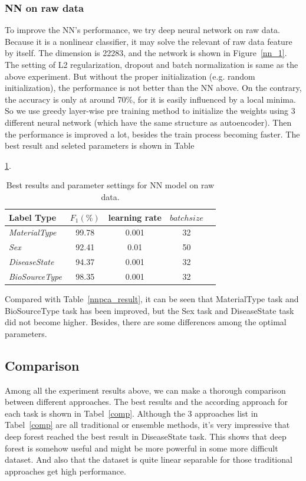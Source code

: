 \documentclass[sigconf]{acmart}
\begin{document}
	\subsubsection{ NN on raw data}
	To improve the NN's performance, we try deep neural network on raw data. Because it is a nonlinear classifier, it may solve the relevant of raw data feature by itself. The dimension is 22283, and the network is shown in Figure~\ref{nn_1}. The setting of L2 regularization, dropout and batch normalization is same as the above experiment. But without the proper initialization (e.g. random initialization), the performance is not better than the NN above. On the contrary, the accuracy is only at around 70\%, for it is easily influenced by a local minima. So we use greedy layer-wise pre training method to initialize the weights using 3 different neural network (which have the same structure as autoencoder). Then the performance is improved a lot, besides the train process becoming faster. The best result and seleted parameters is shown in Table~{\ref{nnraw_result}.\\
			
\begin{table}[tbp]
\centering
\begin{tabular}{l|cccc}
\toprule
{Label Type} & $F_1 (\%)$ & learning rate &$batch size$  \\
\midrule
{\textit{MaterialType}}&99.78 & 0.001 &32\\
{\textit{Sex}}		& 92.41 & 0.01    &50 \\
{\textit{DiseaseState}}& 94.37 & 0.001 &32\\
{\textit{BioSourceType}}& 98.35 & 0.001 &32\\
\bottomrule	
\end{tabular}

\caption{Best results and parameter settings for NN model on raw data. }
\label{nnraw_result}
\end{table}

Compared with Table~\ref{nnpca_result}, it can be seen that MaterialType task and BioSourceType task has been improved, but the Sex task and DiseaseState task did not become higher. Besides, there are some differences among the optimal parameters. 

\subsection{Comparison}
Among all the experiment results above, we can make a thorough comparison between different approaches. The best results and the according approach for each task is shown in Tabel~\ref{comp}. Although the 3 approaches list in Tabel~\ref{comp} are all traditional or ensemble methods, it's very impressive that deep forest reached the best result in DiseaseState task. This shows that deep forest is somehow useful and might be more powerful in some more difficult dataset. And also that the dataset is quite linear separable for those traditional approaches get high performance.

}
\end{document}
